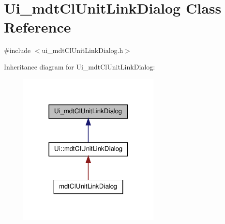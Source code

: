 \hypertarget{class_ui__mdt_cl_unit_link_dialog}{\section{Ui\-\_\-mdt\-Cl\-Unit\-Link\-Dialog Class Reference}
\label{class_ui__mdt_cl_unit_link_dialog}
}


{\ttfamily \#include $<$ui\-\_\-mdt\-Cl\-Unit\-Link\-Dialog.\-h$>$}



Inheritance diagram for Ui\-\_\-mdt\-Cl\-Unit\-Link\-Dialog\-:\nopagebreak
\begin{figure}[H]
\begin{center}
\leavevmode
\includegraphics[width=202pt]{class_ui__mdt_cl_unit_link_dialog__inherit__graph}
\end{center}
\end{figure}


